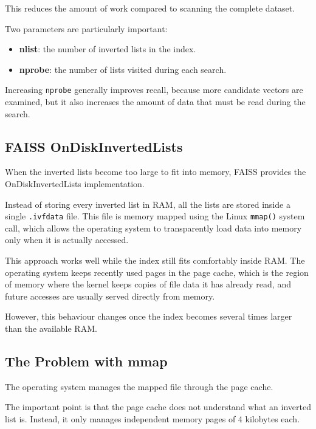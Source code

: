 \documentclass[11pt]{article}
\begin{document}
This reduces the amount of work compared to scanning the complete
dataset.

Two parameters are particularly important:

\begin{itemize}
\item \textbf{nlist}: the number of inverted lists in the index.
\item \textbf{nprobe}: the number of lists visited during each search.
\end{itemize}

Increasing \texttt{nprobe} generally improves recall, because more
candidate vectors are examined, but it also increases the amount of
data that must be read during the search.

\subsection{FAISS OnDiskInvertedLists}

When the inverted lists become too large to fit into memory,
FAISS provides the OnDiskInvertedLists implementation.

Instead of storing every inverted list in RAM, all the lists are
stored inside a single \texttt{.ivfdata} file. This file is memory
mapped using the Linux \texttt{mmap()} system call, which allows the
operating system to transparently load data into memory only when it
is actually accessed.

This approach works well while the index still fits comfortably
inside RAM. The operating system keeps recently used pages in the
page cache, which is the region of memory where the kernel keeps
copies of file data it has already read, and future accesses are
usually served directly from memory.

However, this behaviour changes once the index becomes several
times larger than the available RAM.

\subsection{The Problem with mmap}

The operating system manages the mapped file through the page cache.

The important point is that the page cache does not understand what
an inverted list is. Instead, it only manages independent memory
pages of 4 kilobytes each.
\end{document}
